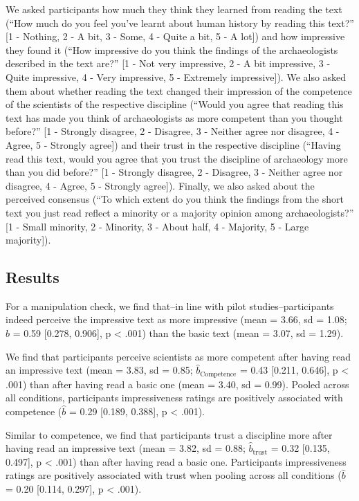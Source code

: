 \documentclass[
  doc,floatsintext]{apa6}
\begin{document}
We asked participants how much they think they learned from reading the text (``How much do you feel you've learnt about human history by reading this text?'' {[}1 - Nothing, 2 - A bit, 3 - Some, 4 - Quite a bit, 5 - A lot{]}) and how impressive they found it (``How impressive do you think the findings of the archaeologists described in the text are?'' {[}1 - Not very impressive, 2 - A bit impressive, 3 - Quite impressive, 4 - Very impressive, 5 - Extremely impressive{]}). We also asked them about whether reading the text changed their impression of the competence of the scientists of the respective discipline (``Would you agree that reading this text has made you think of archaeologists as more competent than you thought before?'' {[}1 - Strongly disagree, 2 - Disagree, 3 - Neither agree nor disagree, 4 - Agree, 5 - Strongly agree{]}) and their trust in the respective discipline (``Having read this text, would you agree that you trust the discipline of archaeology more than you did before?'' {[}1 - Strongly disagree, 2 - Disagree, 3 - Neither agree nor disagree, 4 - Agree, 5 - Strongly agree{]}). Finally, we also asked about the perceived consensus (``To which extent do you think the findings from the short text you just read reflect a minority or a majority opinion among archaeologists?'' {[}1 - Small minority, 2 - Minority, 3 - About half, 4 - Majority, 5 - Large majority{]}).

\subsection{Results}\label{results}

For a manipulation check, we find that--in line with pilot studies--participants indeed perceive the impressive text as more impressive (mean = 3.66, sd = 1.08; \(\hat{b}\) = 0.59 {[}0.278, 0.906{]}, p \textless{} .001) than the basic text (mean = 3.07, sd = 1.29).

We find that participants perceive scientists as more competent after having read an impressive text (mean = 3.83, sd = 0.85; \(\hat{b}_{\text{Competence}}\) = 0.43 {[}0.211, 0.646{]}, p \textless{} .001) than after having read a basic one (mean = 3.40, sd = 0.99). Pooled across all conditions, participants impressiveness ratings are positively associated with competence (\(\hat{b}\) = 0.29 {[}0.189, 0.388{]}, p \textless{} .001).

Similar to competence, we find that participants trust a discipline more after having read an impressive text (mean = 3.82, sd = 0.88; \(\hat{b}_{\text{trust}}\) = 0.32 {[}0.135, 0.497{]}, p \textless{} .001) than after having read a basic one. Participants impressiveness ratings are positively associated with trust when pooling across all conditions (\(\hat{b}\) = 0.20 {[}0.114, 0.297{]}, p \textless{} .001).
\end{document}
